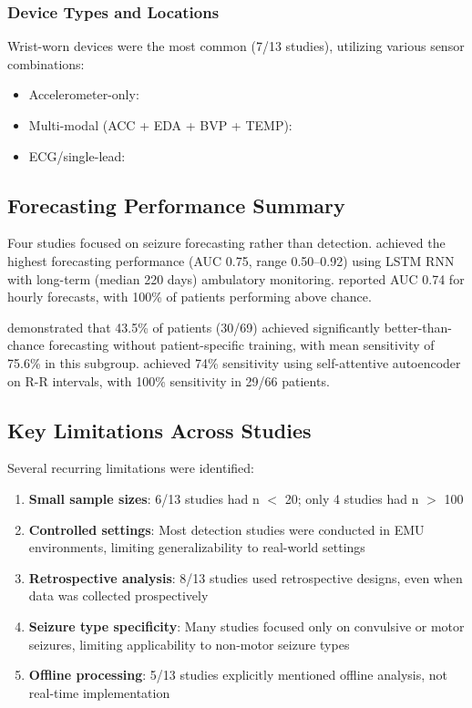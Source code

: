 \subsubsection{Device Types and Locations}
Wrist-worn devices were the most common (7/13 studies), utilizing various sensor combinations:
\begin{itemize}
\item Accelerometer-only: \textcite{spahr2025}
\item Multi-modal (ACC + EDA + BVP + TEMP): \textcite{meisel2020, nasseri2021}
\item ECG/single-lead: \textcite{reintjes2025, ode2023}
\end{itemize}

\subsection{Forecasting Performance Summary}

Four studies focused on seizure forecasting rather than detection. \textcite{nasseri2021} achieved the highest forecasting performance (AUC 0.75, range 0.50--0.92) using LSTM RNN with long-term (median 220 days) ambulatory monitoring. \textcite{stirling2021} reported AUC 0.74 for hourly forecasts, with 100\% of patients performing above chance.

\textcite{meisel2020} demonstrated that 43.5\% of patients (30/69) achieved significantly better-than-chance forecasting without patient-specific training, with mean sensitivity of 75.6\% in this subgroup. \textcite{ode2023} achieved 74\% sensitivity using self-attentive autoencoder on R-R intervals, with 100\% sensitivity in 29/66 patients.

\subsection{Key Limitations Across Studies}

Several recurring limitations were identified:
\begin{enumerate}
\item \textbf{Small sample sizes}: 6/13 studies had n $<$ 20; only 4 studies had n $>$ 100
\item \textbf{Controlled settings}: Most detection studies were conducted in EMU environments, limiting generalizability to real-world settings
\item \textbf{Retrospective analysis}: 8/13 studies used retrospective designs, even when data was collected prospectively
\item \textbf{Seizure type specificity}: Many studies focused only on convulsive or motor seizures, limiting applicability to non-motor seizure types
\item \textbf{Offline processing}: 5/13 studies explicitly mentioned offline analysis, not real-time implementation
\end{enumerate}

